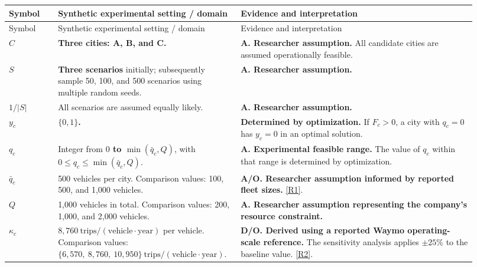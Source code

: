 \documentclass[10pt,a4paper]{article}
\begin{document}
\small
\begin{longtable}{P{0.10\linewidth}P{0.34\linewidth}P{0.48\linewidth}}
\toprule
Symbol & Synthetic experimental setting / domain & Evidence and interpretation \\
\midrule\endfirsthead
\toprule
Symbol & Synthetic experimental setting / domain & Evidence and interpretation \\
\midrule\endhead

$C$ & \textbf{Three cities: A, B, and C.} & \textbf{A. Researcher assumption.} All candidate cities are assumed operationally feasible. \\
\midrule

$S$ & \textbf{Three scenarios} initially; subsequently sample 50, 100, and 500 scenarios using multiple random seeds. & \textbf{A. Researcher assumption.} \\
\midrule

$1/|S|$ & All scenarios are assumed equally likely. & \textbf{A. Researcher assumption.} \\
\midrule

$y_c$ & \textbf{$\{0,1\}$.} & \textbf{Determined by optimization.} If $F_c>0$, a city with $q_c=0$ has $y_c=0$ in an optimal solution. \\
\midrule

$q_c$ & Integer from \textbf{$0$ to $\min(\bar q_c,Q)$}, with $0\le q_c\le\min(\bar q_c,Q)$. & \textbf{A. Experimental feasible range.} The value of $q_c$ within that range is determined by optimization. \\
\midrule

$\bar q_c$ & 500 vehicles per city. Comparison values: 100, 500, and 1,000 vehicles. & \textbf{A/O. Researcher assumption informed by reported fleet sizes.} \hyperlink{rationale-R1}{[R1]}. \\
\midrule

$Q$ & 1,000 vehicles in total. Comparison values: 200, 1,000, and 2,000 vehicles. & \textbf{A. Researcher assumption representing the company's resource constraint.} \\
\midrule

$\kappa_c$
& $8{,}760\ \text{trips}/(\text{vehicle}\cdot\text{year})$ per vehicle. Comparison values: $\{6{,}570,\ 8{,}760,\ 10{,}950\}\ \text{trips}/(\text{vehicle}\cdot\text{year})$.
& \textbf{D/O. Derived using a reported Waymo operating-scale reference.} The sensitivity analysis applies $\pm25\%$ to the baseline value. \hyperlink{rationale-R2}{[R2]}. \\
\midrule


\end{longtable}
\end{document}
